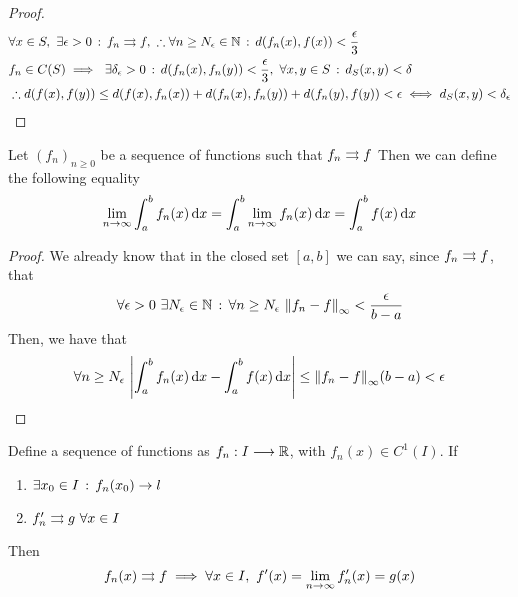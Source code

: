 \documentclass[../complete.tex]{subfiles}
\begin{document}
\begin{proof}
	\begin{equation}
		\begin{aligned}
			&\forall x\in S,\ \exists\epsilon>0\st f_n\tto f,\ \therefore\forall n\ge N_\epsilon\in\N\st d(f_n(x),f(x))<\frac{\epsilon}{3}\\
			&f_n\in C(S)\implies\ \exists\delta_\epsilon>0\st d(f_n(x),f_n(y))<\frac{\epsilon}{3},\ \forall x,y\in S\st d_S(x,y)<\delta\\
			&\therefore d(f(x),f(y))\le d(f(x),f_n(x))+d(f_n(x),f_n(y))+d(f_n(y),f(y))<\epsilon\iff d_S(x,y)<\delta_\epsilon
		\end{aligned}
		\label{eq:proofustopwc}
	\end{equation}
\end{proof}
\begin{thm}
	Let $(f_n)_{n\ge0}$ be a sequence of functions such that $f_n\rightrightarrows f$
	Then we can define the following equality
	\begin{equation}
		\lim_{n\to\infty}\int_a^bf_n(x)\operatorname{d\!} x=\int_a^b\lim_{n\to\infty}f_n(x)\operatorname{d\!} x=\int_a^bf(x)\operatorname{d\!} x
		\label{eq:seqint}
	\end{equation}
\end{thm}
\begin{proof}
	We already know that in the closed set $[a,b]$ we can say, since $f_n\rightrightarrows f$, that
	\begin{equation}
		\forall\epsilon>0\ \exists N_\epsilon\in\N\st\forall n\ge N_\epsilon\ \norm{f_n-f}_{\infty}<\frac{\epsilon}{b-a}
		\label{eq:seqint1}
	\end{equation}
	Then, we have that
	\begin{equation}
		\forall n\ge N_\epsilon\ \abs{\int_{a}^{b}f_n(x)\diff x-\int_{a}^{b}f(x)\diff x}\le\norm{f_n-f}_\infty(b-a)<\epsilon
		\label{eq:seqint2}
	\end{equation}
\end{proof}
\begin{thm}
	Define a sequence of functions as $f_n:I\overset{}{\longrightarrow}\mathbb{R}$, with $f_n(x)\in C^1(I)$. If
	\begin{enumerate}
	\item $\exists x_0\in I\, :\,  f_n(x_0)\to l$
	\item $f_n'\rightrightarrows g\ \forall x\in I$
	\end{enumerate}
	Then
	\begin{equation}
		f_n(x)\rightrightarrows f\implies\forall x\in I,\ f'(x)=\lim_{n\to\infty}f_n'(x)=g(x)
		\label{eq:seqder1}
	\end{equation}
\end{thm}
\end{document}
